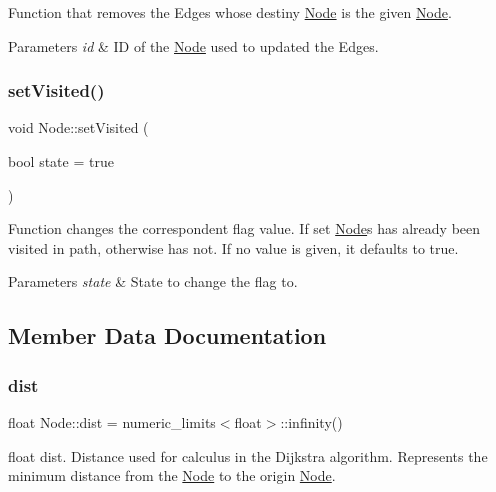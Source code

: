Function that removes the Edges whose destiny \hyperlink{class_node}{Node} is the given \hyperlink{class_node}{Node}.


\begin{DoxyParams}{Parameters}
{\em id} & ID of the \hyperlink{class_node}{Node} used to updated the Edges. \\
\hline
\end{DoxyParams}
\hypertarget{class_node_a9d8e32dbc9c7a9e488b08f4fd1ce178f}{}\label{class_node_a9d8e32dbc9c7a9e488b08f4fd1ce178f} 
\subsubsection{\texorpdfstring{set\+Visited()}{setVisited()}}
{\footnotesize\ttfamily void Node\+::set\+Visited (\begin{DoxyParamCaption}\item[{bool}]{state = {\ttfamily true} }\end{DoxyParamCaption})}

Function changes the correspondent flag value. If set \hyperlink{class_node}{Node}\textquotesingle{}s has already been visited in path, otherwise has not. If no value is given, it defaults to true.


\begin{DoxyParams}{Parameters}
{\em state} & State to change the flag to. \\
\hline
\end{DoxyParams}


\subsection{Member Data Documentation}
\hypertarget{class_node_ae7efda4ec8512d44445f058a479589d3}{}\label{class_node_ae7efda4ec8512d44445f058a479589d3} 
\subsubsection{\texorpdfstring{dist}{dist}}
{\footnotesize\ttfamily float Node\+::dist = numeric\+\_\+limits$<$float$>$\+::infinity()}

float dist. Distance used for calculus in the Dijkstra algorithm. Represents the minimum distance from the \hyperlink{class_node}{Node} to the origin \hyperlink{class_node}{Node}. \hypertarget{class_node_a547c4e0904d03f97ca32a66408b11584}{}\label{class_node_a547c4e0904d03f97ca32a66408b11584} 
